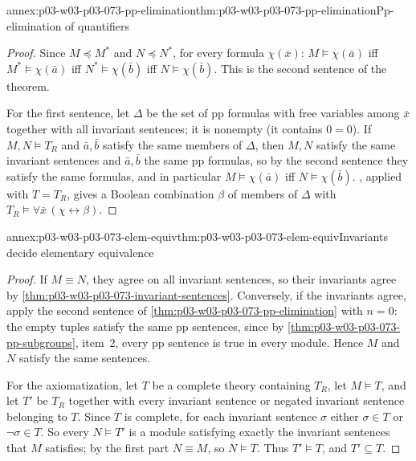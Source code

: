 \begin{annexitem}{annex:p03-w03-p03-073-pp-elimination}{thm:p03-w03-p03-073-pp-elimination}{Pp-elimination of quantifiers}
\begin{proof}
Since \(M\preccurlyeq M^*\) and \(N\preccurlyeq N^*\), for every formula
\(\chi(\bar x)\): \(M\models\chi(\bar a)\) iff \(M^*\models\chi(\bar a)\)
iff \(N^*\models\chi(\bar b)\) iff \(N\models\chi(\bar b)\). This is the
second sentence of the theorem.

For the first sentence, let \(\Delta\) be the set of pp formulas with free
variables among \(\bar x\) together with all invariant sentences; it is
nonempty (it contains \(0=0\)). If \(M,N\models T_R\) and
\(\bar a,\bar b\) satisfy the same members of \(\Delta\), then \(M,N\)
satisfy the same invariant sentences and \(\bar a,\bar b\) the same pp
formulas, so by the second sentence they satisfy the same formulas, and in
particular \(M\models\chi(\bar a)\) iff \(N\models\chi(\bar b)\).
, applied with \(T=T_R\), gives a
Boolean combination \(\beta\) of members of \(\Delta\) with
\(T_R\models\forall\bar x\,(\chi\leftrightarrow\beta)\).
\end{proof}
\end{annexitem}

\begin{annexitem}{annex:p03-w03-p03-073-elem-equiv}{thm:p03-w03-p03-073-elem-equiv}{Invariants decide elementary equivalence}
\begin{proof}
If \(M\equiv N\), they agree on all invariant sentences, so their
invariants agree by \cref{thm:p03-w03-p03-073-invariant-sentences}.
Conversely, if the invariants agree, apply the second sentence of
\cref{thm:p03-w03-p03-073-pp-elimination} with \(n=0\): the empty tuples
satisfy the same pp sentences, since by
\cref{thm:p03-w03-p03-073-pp-subgroups}, item~2, every pp sentence is true
in every module. Hence \(M\) and \(N\) satisfy the same sentences.

For the axiomatization, let \(T\) be a complete theory containing \(T_R\),
let \(M\models T\), and let \(T'\) be \(T_R\) together with every
invariant sentence or negated invariant sentence belonging to \(T\). Since
\(T\) is complete, for each invariant sentence \(\sigma\) either
\(\sigma\in T\) or \(\neg\sigma\in T\). So every \(N\models T'\) is a
module satisfying exactly the invariant sentences that \(M\) satisfies;
by the first part \(N\equiv M\), so \(N\models T\). Thus \(T'\models T\),
and \(T'\subseteq T\).
\end{proof}
\end{annexitem}

